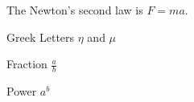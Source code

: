 \documentclass{article}
\begin{document}
The Newton's second law is $F=ma$.
 
Greek Letters $\eta$ and $\mu$ 
 
Fraction $\frac{a}{b}$ 
 
Power $a^b$  
\end{document}
